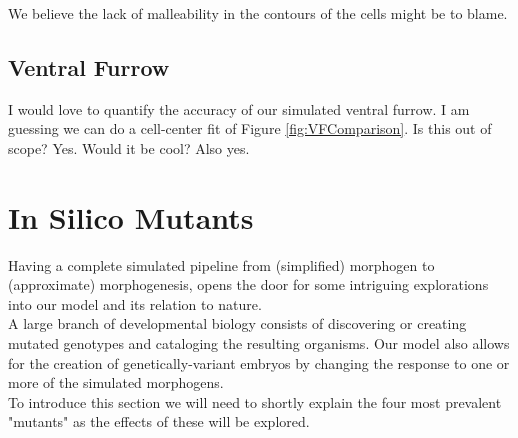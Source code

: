 We believe the lack of malleability in the contours of the cells might be to blame.





\subsection{Ventral Furrow}
I would love to quantify the accuracy of our simulated ventral furrow.
I am guessing we can do a cell-center fit of Figure \ref{fig:VFComparison}.
Is this out of scope? Yes. Would it be cool? Also yes.
\newpage
\section{In Silico Mutants}

Having a complete simulated pipeline from (simplified) morphogen to (approximate) morphogenesis, opens the door for some intriguing explorations into our model and its relation to nature.\\

A large branch of developmental biology consists of discovering or creating mutated genotypes and cataloging the resulting organisms. 
Our model also allows for the creation of genetically-variant embryos by changing the response to one or more of the simulated morphogens.\\

To introduce this section we will need to shortly explain the four most prevalent "mutants" as the effects of these will be explored. 

